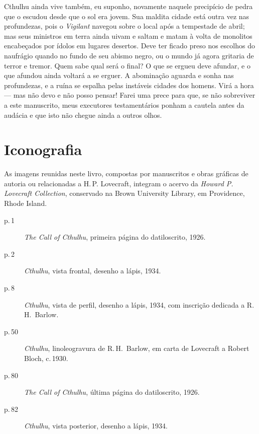 Cthulhu ainda vive também, eu suponho, novamente naquele precipício de
pedra que o escudou desde que o sol era jovem. Sua maldita cidade está
outra vez nas profundezas, pois o \emph{Vigilant} navegou sobre o local
após a tempestade de abril; mas seus ministros em terra ainda uivam e
saltam e matam à volta de monolitos encabeçados por ídolos em lugares
desertos. Deve ter ficado preso nos escolhos do naufrágio quando no
fundo de seu abismo negro, ou o mundo já agora gritaria de terror e
tremor. Quem sabe qual será o final? O que se ergueu deve afundar, e o
que afundou ainda voltará a se erguer. A abominação aguarda e sonha nas
profundezas, e a ruína se espalha pelas instáveis cidades dos homens.
Virá a hora --- mas não devo e não posso pensar! Farei uma prece para
que, se não sobreviver a este manuscrito, meus executores testamentários
ponham a cautela antes da audácia e que isto não chegue ainda a outros
olhos.

\clearpage
\thispagestyle{empty}
\null\clearpage %

\pagebreak

\chapter{Iconografia}

As imagens reunidas neste livro, compostas por manuscritos e obras gráficas 
de autoria ou relacionadas a H.\,P. Lovecraft, integram o acervo da \emph{Howard P. 
Lovecraft Collection}, conservado na Brown University Library, 
em Providence, Rhode Island.

\bigskip
\bigskip

\begin{description}
  \item[p.\,1] \emph{The Call of Cthulhu}, primeira página do datiloscrito, 1926. 

  \item[p.\,2] \emph{Cthulhu}, vista frontal, desenho a lápis, 1934. 

  \item[p.\,8] \emph{Cthulhu}, vista de perfil, desenho a lápis, 1934, com inscrição dedicada a R.\,H.~Barlow. 

  \item[p.\,50] \emph{Cthulhu}, linoleogravura de R.\,H.~Barlow, em carta de Lovecraft a Robert Bloch, c.\,1930. 

  \item[p.\,80] \emph{The Call of Cthulhu}, última página do datiloscrito, 1926. 

  \item[p.\,82] \emph{Cthulhu}, vista posterior, desenho a lápis, 1934. 
\end{description}



